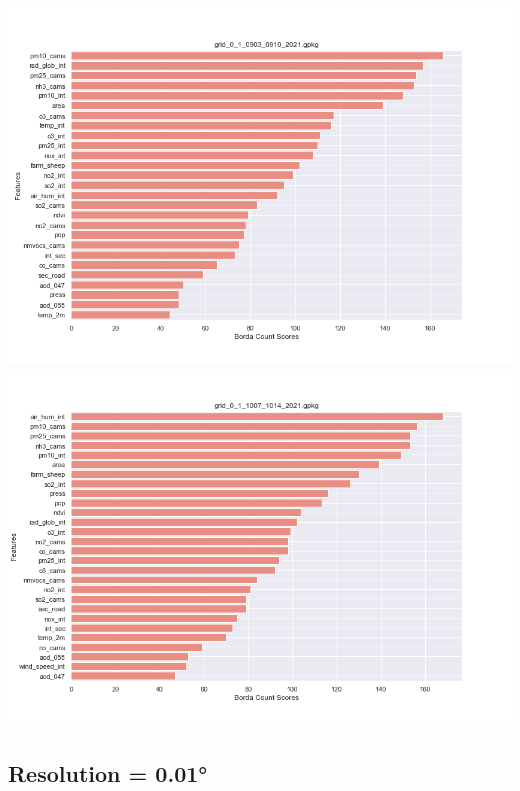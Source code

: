 \begin{center}
\includegraphics[width=.9\textwidth]{images/fs_results/nh3/01/no_montains/grid_0_1_0903_0910_2021.png}
\includegraphics[width=.9\textwidth]{images/fs_results/nh3/01/no_montains/grid_0_1_1007_1014_2021.png}
\end{center}


\subsection{Resolution = 0.01°}
